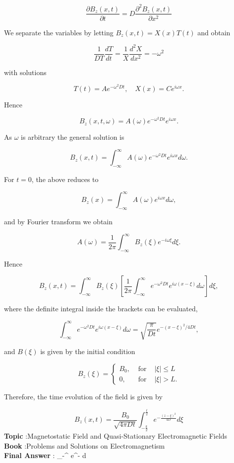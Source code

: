 \documentclass[10pt]{article}
\begin{document}
$$
\frac{\partial B_{z}(x, t)}{\partial t}=D \frac{\partial^{2} B_{z}(x, t)}{\partial x^{2}}
$$

We separate the variables by letting $B_{z}(x, t)=X(x) T(t)$ and obtain

$$
\frac{1}{D T} \frac{d T}{d t}=\frac{1}{X} \frac{d^{2} X}{d x^{2}}=-\omega^{2}
$$

with solutions

$$
T(t)=A e^{-\omega^{2} D t}, \quad X(x)=C e^{i \omega x} .
$$

Hence

$$
B_{z}(x, t, \omega)=A(\omega) e^{-\omega^{2} D t} e^{i \omega x} .
$$

As $\omega$ is arbitrary the general solution is

$$
B_{z}(x, t)=\int_{-\infty}^{\infty} A(\omega) e^{-\omega^{2} D t} e^{i \omega x} d \omega .
$$

For $t=0$, the above reduces to

$$
B_{z}(x)=\int_{-\infty}^{\infty} A(\omega) e^{i \omega x} d \omega,
$$

and by Fourier transform we obtain

$$
A(\omega)=\frac{1}{2 \pi} \int_{-\infty}^{\infty} B_{z}(\xi) e^{-i \omega \xi} d \xi .
$$

Hence

$$
B_{z}(x, t)=\int_{-\infty}^{\infty} B_{z}(\xi)\left[\frac{1}{2 \pi} \int_{-\infty}^{\infty} e^{-\omega^{2} D t} e^{i \omega(x-\xi)} d \omega\right] d \xi,
$$

where the definite integral inside the brackets can be evaluated,

$$
\int_{-\infty}^{\infty} e^{-\omega^{2} D t} e^{i \omega(x-\xi)} d \omega=\sqrt{\frac{\pi}{D t}} e^{-(x-\xi)^{2} / 4 D t},
$$

and $B(\xi)$ is given by the initial condition

$$
B_{z}(\xi)=\left\{\begin{array}{lll}
B_{0}, & \text { for } & |\xi| \leq L \\
0, & \text { for } & |\xi|>L .
\end{array}\right.
$$

Therefore, the time evolution of the field is given by

$$
B_{z}(x, t)=\frac{B_{0}}{\sqrt{4 \pi D t}} \int_{-\frac{k}{2}}^{\frac{t}{2}} e^{-\frac{(z-\xi)^{2}}{4 D}} d \xi
$$
\textbf{Topic} :Magnetostatic Field and Quasi-Stationary Electromagnetic Fields\\
\textbf{Book} :Problems and Solutions on Electromagnetism\\
\textbf{Final Answer} : \int_{-}^{} e^{-} d \xi\\
\end{document}

